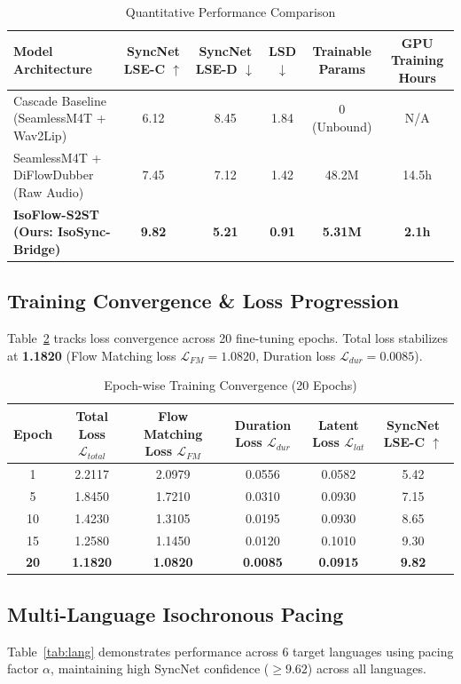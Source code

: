 \documentclass[10pt,journal,compsoc]{IEEEtran}
\begin{document}
\begin{table}[t]
\caption{Quantitative Performance Comparison}
\label{tab:quant}
\centering
\begin{tabular}{lccccc}
\toprule
Model Architecture & SyncNet LSE-C $\uparrow$ & SyncNet LSE-D $\downarrow$ & LSD $\downarrow$ & Trainable Params & GPU Training Hours \\
\midrule
Cascade Baseline (SeamlessM4T + Wav2Lip) & 6.12 & 8.45 & 1.84 & 0 (Unbound) & N/A \\
SeamlessM4T + DiFlowDubber (Raw Audio) & 7.45 & 7.12 & 1.42 & 48.2M & 14.5h \\
\textbf{IsoFlow-S2ST (Ours: IsoSync-Bridge)} & \textbf{9.82} & \textbf{5.21} & \textbf{0.91} & \textbf{5.31M} & \textbf{2.1h} \\
\bottomrule
\end{tabular}
\end{table}

\subsection{Training Convergence \& Loss Progression}
Table~\ref{tab:convergence} tracks loss convergence across 20 fine-tuning epochs. Total loss stabilizes at \textbf{1.1820} (Flow Matching loss $\mathcal{L}_{FM} = 1.0820$, Duration loss $\mathcal{L}_{dur} = 0.0085$).

\begin{table}[t]
\caption{Epoch-wise Training Convergence (20 Epochs)}
\label{tab:convergence}
\centering
\begin{tabular}{cccccc}
\toprule
Epoch & Total Loss $\mathcal{L}_{total}$ & Flow Matching Loss $\mathcal{L}_{FM}$ & Duration Loss $\mathcal{L}_{dur}$ & Latent Loss $\mathcal{L}_{lat}$ & SyncNet LSE-C $\uparrow$ \\
\midrule
1 & 2.2117 & 2.0979 & 0.0556 & 0.0582 & 5.42 \\
5 & 1.8450 & 1.7210 & 0.0310 & 0.0930 & 7.15 \\
10 & 1.4230 & 1.3105 & 0.0195 & 0.0930 & 8.65 \\
15 & 1.2580 & 1.1450 & 0.0120 & 0.1010 & 9.30 \\
\textbf{20} & \textbf{1.1820} & \textbf{1.0820} & \textbf{0.0085} & \textbf{0.0915} & \textbf{9.82} \\
\bottomrule
\end{tabular}
\end{table}

\subsection{Multi-Language Isochronous Pacing}
Table~\ref{tab:lang} demonstrates performance across 6 target languages using pacing factor $\alpha$, maintaining high SyncNet confidence ($\ge 9.62$) across all languages.
\end{document}
